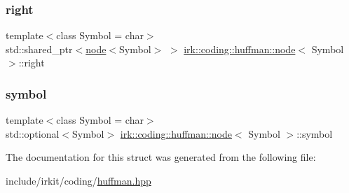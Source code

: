 \mbox{\label{structirk_1_1coding_1_1huffman_1_1node_addc238c8601bb721a25a5750f6c33ebd}} 
\subsubsection{\texorpdfstring{right}{right}}
{\footnotesize\ttfamily template$<$class Symbol = char$>$ \\
std\+::shared\+\_\+ptr$<$\mbox{\hyperlink{structirk_1_1coding_1_1huffman_1_1node}{node}}$<$Symbol$>$ $>$ \mbox{\hyperlink{structirk_1_1coding_1_1huffman_1_1node}{irk\+::coding\+::huffman\+::node}}$<$ Symbol $>$\+::right}

\mbox{\label{structirk_1_1coding_1_1huffman_1_1node_a5506528b3c23fa2187b767a90ca3bfcc}} 
\subsubsection{\texorpdfstring{symbol}{symbol}}
{\footnotesize\ttfamily template$<$class Symbol = char$>$ \\
std\+::optional$<$Symbol$>$ \mbox{\hyperlink{structirk_1_1coding_1_1huffman_1_1node}{irk\+::coding\+::huffman\+::node}}$<$ Symbol $>$\+::symbol}



The documentation for this struct was generated from the following file\+:\begin{DoxyCompactItemize}
\item 
include/irkit/coding/\mbox{\hyperlink{huffman_8hpp}{huffman.\+hpp}}\end{DoxyCompactItemize}
